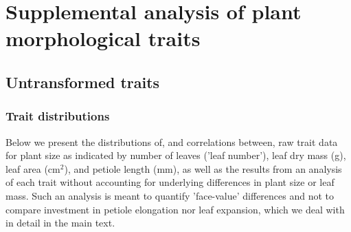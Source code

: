 \documentclass[11pt, oneside]{amsart}
\begin{document}
\newpage

\section{Supplemental analysis of plant morphological traits}
\subsection{Untransformed traits}
\subsubsection{Trait distributions}
Below we present the distributions of, and correlations between, raw trait data for plant size as indicated by number of leaves ('leaf number'), leaf dry mass (g), leaf area (cm$^2$), and petiole length (mm), as well as the results from an analysis of each trait without accounting for underlying differences in plant size or leaf mass. Such an analysis is meant to quantify 'face-value' differences and not to compare investment in petiole elongation nor leaf expansion, which we deal with in detail in the main text.

\vspace{2cm}
\end{document}
